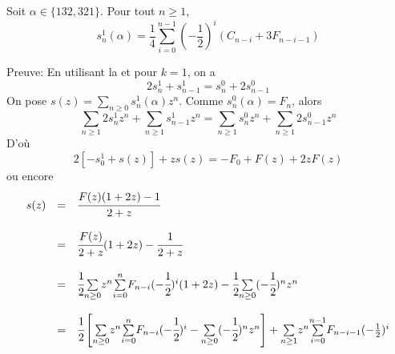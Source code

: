 \begin{proposition}
	Soit $\alpha\in \{132,321\}$. Pour tout
	$ n\geq 1$, \[s_{n}^{1}(\alpha)=\frac{1}{4}\underset{i=0}{\overset{n-1}{\sum}}(-\frac{1}{2})^{i}\left(C_{n-i}+3F_{n-i-1}\right) \]
\end{proposition}

Preuve:
En utilisant la  et pour $k=1$, on a\[ 2s_{n}^{1}+s_{n-1}^{1}=s_{n}^{0}+2s_{n-1}^{0} \]
On pose $s(z)=\underset{n\geq 0}{\sum}s_{n}^{1}(\alpha)z^{n}$. Comme $s_{n}^{0}(\alpha)=F_{n}$, alors
\[
	\underset{n\geq 1}{\sum}2s_{n}^{1}z^n + \underset{n\geq 1}{\sum}s_{n-1}^{1}z^n = \underset{n\geq 1}{\sum}s_{n}^{0}z^n + \underset{n\geq 1}{\sum}2s_{n-1}^{0}z^n
\]
D'où
\[2[-s_{0}^{1}+s(z)]+zs(z)=-F_{0}+F(z)+2zF(z) \]ou encore
\[
	\begin{array}{l l l}
		s(z) & =       & \cfrac{F(z)(1+2z)-1}{2+z}                                                                                                                                                                                                                                      \\
		     & \text{} &                                                                                                                                                                                                                                                                \\
		     & =       & \cfrac{F(z)}{2+z}(1+2z)-\cfrac{1}{2+z}                                                                                                                                                                                                                         \\
		     & \text{} &                                                                                                                                                                                                                                                                \\
		     & =       & \cfrac{1}{2}\underset{n\geq 0}{\sum}z^{n}\underset{i=0}{\overset{n}{\sum}}F_{n-i}(-\cfrac{1}{2})^{i}(1+2z)-\cfrac{1}{2}\underset{n\geq 0}{\sum}(-\cfrac{1}{2})^{n}z^{n}                                                                                       \\
		     & \text{} &                                                                                                                                                                                                                                                                \\
		     & =       & \cfrac{1}{2}\left[\underset{n\geq 0}{\sum}z^{n}\underset{i=0}{\overset{n}{\sum}}F_{n-i}(-\cfrac{1}{2})^{i}-\underset{n\geq 0}{\sum}(-\cfrac{1}{2})^{n}z^{n}\right]+\underset{n\geq 1}{\sum}z^{n}\underset{i=0}{\overset{n-1}{\sum}}F_{n-i-1}(-\frac{1}{2})^{i}
	\end{array}
\]
